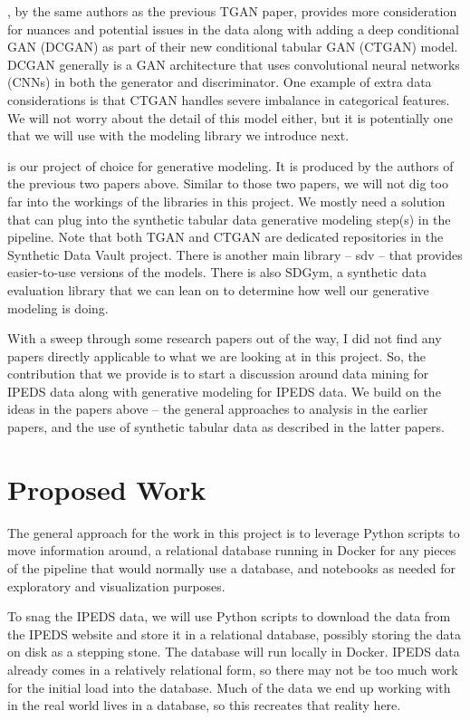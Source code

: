 \documentclass[sigconf, authorversion, nonacm]{acmart}
\begin{document}
    \cite{DBLP:journals/corr/abs-1907-00503}, by the same authors as the previous TGAN paper, provides more consideration for nuances and potential issues in the data along with adding a deep conditional GAN (DCGAN) as part of their new conditional tabular GAN (CTGAN) model. DCGAN generally is a GAN architecture that uses convolutional neural networks (CNNs) in both the generator and discriminator. One example of extra data considerations is that CTGAN handles severe imbalance in categorical features. We will not worry about the detail of this model either, but it is potentially one that we will use with the modeling library we introduce next.

    \cite{sdv} is our project of choice for generative modeling. It is produced by the authors of the previous two papers above. Similar to those two papers, we will not dig too far into the workings of the libraries in this project. We mostly need a solution that can plug into the synthetic tabular data generative modeling step(s) in the pipeline. Note that both TGAN and CTGAN are dedicated repositories in the Synthetic Data Vault project. There is another main library -- sdv -- that provides easier-to-use versions of the models. There is also SDGym, a synthetic data evaluation library that we can lean on to determine how well our generative modeling is doing.

    With a sweep through some research papers out of the way, I did not find any papers directly applicable to what we are looking at in this project. So, the contribution that we provide is to start a discussion around data mining for IPEDS data along with generative modeling for IPEDS data. We build on the ideas in the papers above -- the general approaches to analysis in the earlier papers, and the use of synthetic tabular data as described in the latter papers.

\section{Proposed Work}

    The general approach for the work in this project is to leverage Python scripts to move information around, a relational database running in Docker for any pieces of the pipeline that would normally use a database, and notebooks as needed for exploratory and visualization purposes.

    To snag the IPEDS data, we will use Python scripts to download the data from the IPEDS website and store it in a relational database, possibly storing the data on disk as a stepping stone. The database will run locally in Docker. IPEDS data already comes in a relatively relational form, so there may not be too much work for the initial load into the database. Much of the data we end up working with in the real world lives in a database, so this recreates that reality here.
\end{document}
